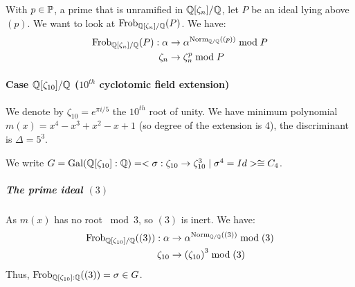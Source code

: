 With $p \in \primes$, a prime that is unramified in $\Q[\zeta_n]/\Q$, let $P$ be an ideal lying above $(p)$.
We want to look at $\Frob{\Q[\zeta_n]/\Q}{P}$.
We have:
\begin{align*}
	\Frob{\Q[\zeta_n]/\Q}{P}: 
	\alpha&\to \alpha^{\Norm[\Q/\Q]{(p)}} \bmod P\\
	\zeta_n&\to \zeta_n^p \bmod P
\end{align*}

\paragraph{Case $\Q[\zeta_{10}]/\Q$ ($10^{th}$ cyclotomic field extension)}
We denote by $\zeta_{10}=e^{\pi i/5}$ the $10^{th}$ root of unity.
We have minimum polynomial $m(x) = x^4-x^3+x^2-x+1$ (so degree of the extension is 4), the discriminant is $\Delta = 5^3$.

We write $
G = \Gal{\Q[\zeta_{10}]:\Q} 
= < \sigma: \zeta_{10} \to \zeta_{10}^3 \mid \sigma^4 = Id > \cong C_4$.




\subparagraph{The prime ideal $(3)$}
As $m(x)$ has no root $\bmod 3$, so $(3)$ is inert.
We have:
\begin{align*}
	\Frob{\Q[\zeta_{10}]/\Q}{(3)}:
	\alpha   &\to \alpha^{\Norm[\Q/\Q]{(3)}} \bmod (3)\\
	\zeta_{10} &\to \left( \zeta_{10} \right)^3 \bmod (3)
\end{align*}
Thus, $\Frob{\Q[\zeta_{10}]:\Q}{(3)} = \sigma \in G$.

